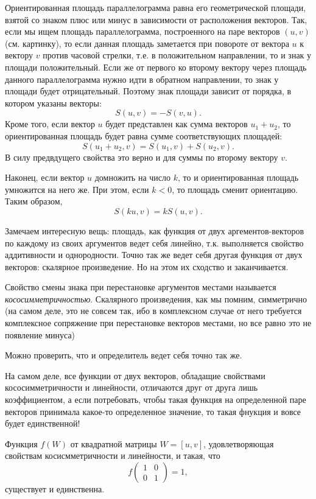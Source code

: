 \begin{enumerate}
Ориентированная площадь параллелограмма равна его геометрической площади, взятой со знаком плюс или минус в зависимости от расположения векторов. Так, если мы ищем площадь параллелограмма, построенного на паре векторов $(u,v)$ (см. картинку), то если данная площадь заметается при повороте от вектора $u$ к вектору $v$ против часовой стрелки, т.е. в положительном направлении, то и знак у площади положительный. Если же от первого ко второму вектору через площадь данного параллелограмма нужно идти в обратном направлении, то знак у площади будет отрицательный. Поэтому знак площади зависит от порядка, в котором указаны векторы:
$$
S(u,v) = -S(v,u).
$$
Кроме того, если вектор $u$ будет представлен как сумма векторов $u_1+u_2$, то ориентированная площадь будет равна сумме соответствующих площадей:
$$
S(u_1+u_2,v)=S(u_1,v)+S(u_2,v).
$$
В силу предвдущего свойства это верно и для суммы по второму вектору $v$.

Наконец, если вектор $u$ домножить на число $k$, то и ориентированная площадь умножится на него же. При этом, если $k<0$, то площадь сменит ориентацию. Таким образом,
$$
S(ku,v) = kS(u,v).
$$

Замечаем интересную вещь: площадь, как функция от двух аргементов-векторов по каждому из своих аргументов ведет себя линейно, т.к. выполняется свойство аддитивности и однородности. Точно так же ведет себя другая функция от двух векторов: скалярное произведение. Но на этом их сходство и заканчивается.

Свойство смены знака при перестановке аргументов местами называется \textit{кососимметричностью}. Скалярного произведения, как мы помним, симметрично (на самом деле, это не совсем так, ибо в комплексном случае от него требуется комплексное сопряжение при перестановке векторов местами, но все равно это не появление минуса)

Можно проверить, что и определитель ведет себя точно так же.

На самом деле, все функции от двух векторов, обладащие свойствами кососимметричности и линейности, отличаются друг от друга лишь коэффициентом, а если потребовать, чтобы такая функция на определенной паре векторов принимала какое-то определенное значение, то такая фнукция и вовсе будет единственной!
\begin{thrm}
Функция $f(W)$ от квадратной матрицы $W=[u,v]$, удовлетворяющая свойствам косисмметричности и линейности, и такая, что
$$
f\begin{pmatrix}
1 & 0 \\ 0 & 1
\end{pmatrix}=1,
$$
существует и единственна.
\end{thrm}


\end{enumerate}

